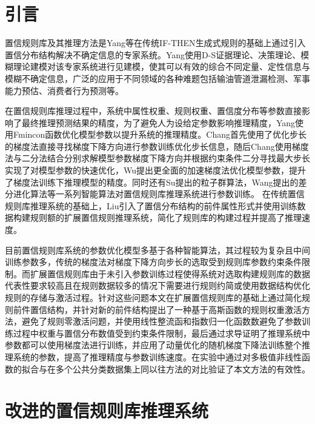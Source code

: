\documentclass{cjc}
\begin{document}
\maketitle

\section{引言}
置信规则库\cite{a3}及其推理方法是Yang等在传统IF-THEN\cite{a5}生成式规则的基础上通过引入置信分布结构解决不确定信息的专家系统。Yang使用D-S证据理论\cite{a1,a2}、决策理论\cite{b1}、模糊理论\cite{a4}建模对该专家系统进行见建模，使其可以有效的综合不同定量、定性信息与模糊不确定信息，广泛的应用于不同领域的各种难题包括输油管道泄漏检测\cite{a6}、军事能力预估\cite{a7}、消费者行为预测\cite{a8}等。

在置信规则库推理过程中，系统中属性权重、规则权重、置信度分布等参数直接影响了最终推理预测结果的精度，为了避免人为设给定参数影响推理精度，Yang使用Fmincon\cite{a9}函数优化模型参数以提升系统的推理精度。Chang\cite{a10}首先使用了优化步长的梯度法直接寻找梯度下降方向进行参数训练优化步长信息，随后Chang\cite{a11}使用梯度法与二分法结合分别求解模型参数梯度下降方向并根据约束条件二分寻找最大步长实现了对模型参数的快速优化，Wu\cite{a12}提出更全面的加速梯度法优化模型参数，提升了梯度法训练下推理模型的精度。同时还有Su\cite{a13}提出的粒子群算法，Wang\cite{a14}提出的差分进化算法等一系列智能算法对置信规则库推理系统进行参数训练。 在传统置信规则库推理系统的基础上，Liu\cite{a15}引入了置信分布结构的前件属性形式并使用训练数据构建规则额的扩展置信规则推理系统，简化了规则库的构建过程并提高了推理速度。

目前置信规则库系统的参数优化模型多基于各种智能算法，其过程较为复杂且中间训练参数多，传统的梯度法对梯度下降方向步长的选取受到规则库参数约束条件限制。而扩展置信规则库由于未引入参数训练过程使得系统对选取构建规则库的数据代表性要求较高且在规则数据较多的情况下需要进行规则约简或使用数据结构优化规则的存储与激活过程。针对这些问题本文在扩展置信规则库的基础上通过简化规则前件置信结构，并针对新的前件结构提出了一种基于高斯函数的规则权重激活方法，避免了规则零激活问题，并使用线性整流函和指数归一化函数数避免了参数训练过程中权重与置信分布数值受到约束条件限制，最后通过求导证明了推理系统中参数都可以使用梯度法进行训练，并应用了动量优化的随机梯度下降法训练整个推理系统的参数，提高了推理精度与参数训练速度。在实验中通过对多极值非线性函数的拟合与在多个公共分类数据集上同以往方法的对比验证了本文方法的有效性。
\section{改进的置信规则库推理系统}
\end{document}
